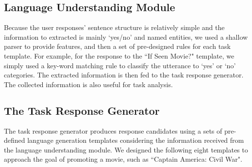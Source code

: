 \documentclass[11pt]{article}
\newcommand{\dk}[1]{{\color{red} #1}}
\begin{document}
\subsection{Language Understanding Module}
Because the user responses' sentence structure is relatively simple and the information to extracted is mainly `yes/no' and named entities, we used a shallow parser to provide features, and then a set of pre-designed rules for each task template. For example, for the response to the ``If Seen Movie?" template, we simply used a key-word matching rule to classify the utterance to `yes' or `no' categories. The extracted information is then fed to the task response generator. The collected information is also useful for task analysis. %

\subsection{The Task Response Generator}
The task response generator produces response candidates using a sets of pre-defined language generation templates considering the information received from the language understanding module. We designed the following eight templates to approach the goal of promoting a movie, such as ``Captain America: Civil War". 
\end{document}
